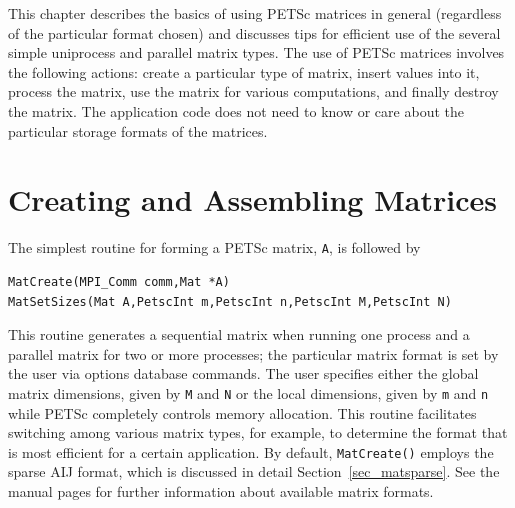 This chapter describes the basics of using PETSc matrices in general
(regardless of the particular format chosen) and discusses tips for
efficient use of the several simple uniprocess and parallel matrix
types.  The use of PETSc matrices involves the following actions:
create a particular type of matrix, insert values into it, process the
matrix, use the matrix for various computations, and finally destroy
the matrix.  The application code does not need to know or care about
the particular storage formats of the matrices.

\section{Creating and Assembling Matrices}
\label{sec_matcreate}

The simplest routine for forming a PETSc matrix, \lstinline{A}, is
followed by
\begin{lstlisting}
MatCreate(MPI_Comm comm,Mat *A)
MatSetSizes(Mat A,PetscInt m,PetscInt n,PetscInt M,PetscInt N)
\end{lstlisting}
This routine generates a sequential matrix when running one
process and a parallel matrix for two or more processes; the
particular matrix format is set by the user via options database
commands.  The user specifies either the global matrix dimensions, given
by \lstinline{M} and \lstinline{N} or the local dimensions, given by \lstinline{m} and
\lstinline{n} while PETSc completely controls memory allocation.  This routine
facilitates switching among various matrix types, for example, to
determine the format that is most efficient for a certain
application.  By default, \lstinline{MatCreate()} employs the sparse AIJ
format, which is discussed in detail Section~\ref{sec_matsparse}.  See
the manual pages for further information about available matrix formats.

